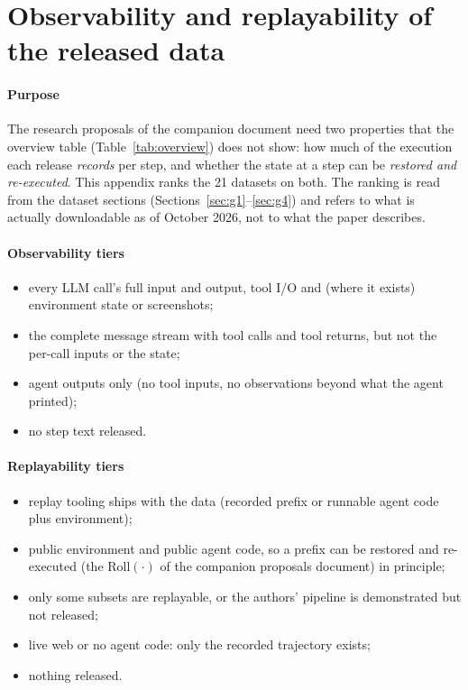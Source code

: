 \clearpage\appendix
\section{Observability and replayability of the released data}\label{app:obs}

\paragraph{Purpose} The research proposals of the companion document  need two properties that the overview table (Table~\ref{tab:overview}) does not show: how much of the execution each release \emph{records} per step, and whether the state at a step can be \emph{restored and re-executed}. This appendix ranks the 21 datasets on both. The ranking is read from the dataset sections (Sections~\ref{sec:g1}--\ref{sec:g4}) and refers to what is actually downloadable as of October 2026, not to what the paper describes.

\paragraph{Observability tiers}
\begin{itemize}[leftmargin=1.1em]
\item {} every LLM call's full input and output, tool I/O and (where it exists) environment state or screenshots;
\item {} the complete message stream with tool calls and tool returns, but not the per-call inputs or the state;
\item {} agent outputs only (no tool inputs, no observations beyond what the agent printed);
\item {} no step text released.
\end{itemize}

\paragraph{Replayability tiers}
\begin{itemize}[leftmargin=1.1em]
\item {} replay tooling ships with the data (recorded prefix or runnable agent code plus environment);
\item {} public environment and public agent code, so a prefix can be restored and re-executed (the $\mathrm{Roll}(\cdot)$ of the companion proposals document) in principle;
\item {} only some subsets are replayable, or the authors' pipeline is demonstrated but not released;
\item {} live web or no agent code: only the recorded trajectory exists;
\item {} nothing released.
\end{itemize}

